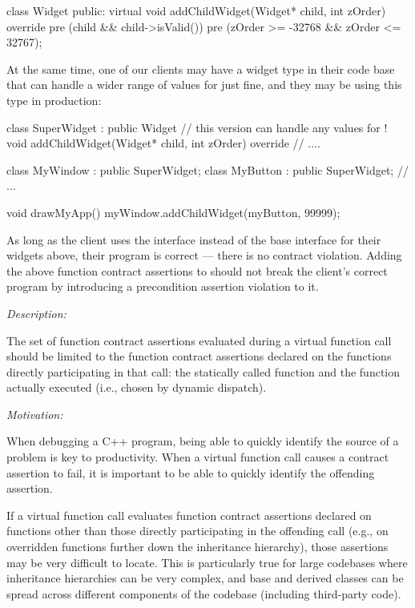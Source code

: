 \begin{codeblock}
class Widget {
public:
  virtual void addChildWidget(Widget* child, int zOrder) override
    pre (child && child->isValid())
    pre (zOrder >= -32768 && zOrder <= 32767);
}
\end{codeblock}

At the same time, one of our clients may have a widget type in their code base that can handle a wider range of values for  just fine, and they may be using this type in production:

\begin{codeblock}
class SuperWidget : public Widget {
  // this version can handle any values for !
  void addChildWidget(Widget* child, int zOrder) override {
    // ....
  } 
}

class MyWindow : public SuperWidget;
class MyButton : public SuperWidget;
// ...

void drawMyApp() {
  myWindow.addChildWidget(myButton, 99999);
}
\end{codeblock}
As long as the client uses the  interface instead of the base  interface for their widgets above, their program is correct --- there is no contract violation. Adding the above function contract assertions to \allowbreak{} should not break the client's correct program by introducing a precondition assertion violation to it.



\emph{Description:}

The set of function contract assertions evaluated during a virtual function call should be limited to the function contract assertions declared on the functions directly participating in that call: the statically called function and the function actually executed (i.e., chosen by dynamic dispatch). 

\emph{Motivation:}

When debugging a C++ program, being able to quickly identify the source of a problem is key to productivity. When a virtual function call causes a contract assertion to fail, it is important to be able to quickly identify the offending assertion.

If a virtual function call evaluates function contract assertions declared on functions other than those directly participating in the offending call (e.g., on overridden functions further down the inheritance hierarchy), those assertions may be very difficult to locate. This is particularly true for large codebases where inheritance hierarchies can be very complex, and base and derived classes can be spread across different components of the codebase (including third-party code).


